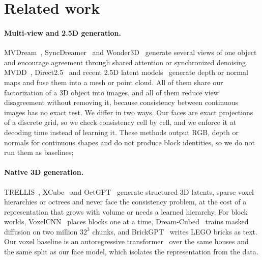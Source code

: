 \section{Related work}
\label{sec:related}

\paragraph{Multi-view and 2.5D generation.}
MVDream~\citep{shi2024mvdream}, SyncDreamer~\citep{liu2024syncdreamer} and Wonder3D~\citep{long2024wonder3d}
generate several views of one object and encourage agreement through shared attention or synchronized
denoising. MVDD~\citep{wang2024mvdd}, Direct2.5~\citep{lu2024direct25} and recent 2.5D latent
models~\citep{latents25d2025} generate depth or normal maps and fuse them into a mesh or point cloud.
All of them share our factorization of a 3D object into images, and all of them reduce view
disagreement without removing it, because consistency between continuous images has no exact test. We
differ in two ways. Our faces are exact projections of a discrete grid, so we check consistency cell by
cell, and we enforce it at decoding time instead of learning it. These methods output RGB, depth or
normals for continuous shapes and do not produce block identities, so we do not run them as baselines;

\paragraph{Native 3D generation.}
TRELLIS~\citep{xiang2025trellis}, XCube~\citep{ren2024xcube} and OctGPT~\citep{wei2025octgpt} generate
structured 3D latents, sparse voxel hierarchies or octrees and never face the consistency problem,
at the cost of a representation that grows with volume or needs a learned hierarchy. For block worlds,
VoxelCNN~\citep{chen2019voxelcnn} places blocks one at a time, Dream-Cubed~\citep{merino2026dreamcubed}
trains masked diffusion on two million $32^3$ chunks, and BrickGPT~\citep{pun2025brickgpt} writes LEGO
bricks as text. Our voxel baseline is an autoregressive transformer~\citep{vaswani2017attention} over
the same houses and the same split as our face model, which isolates the representation from the data.

